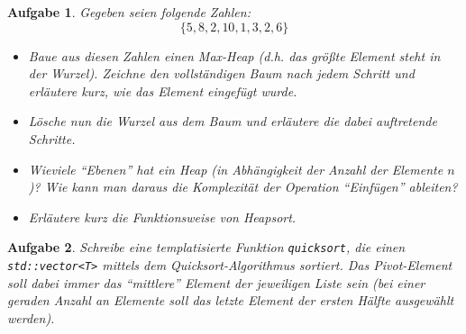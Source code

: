 \documentclass[a4paper,12pt,parskip=full]{scrartcl}
\theoremstyle{exercise}
\newtheorem{exercise}{Aufgabe}
\begin{document}
\begin{exercise}
Gegeben seien folgende Zahlen:
$$ \{ 5, 8, 2, 10, 1, 3, 2, 6 \} $$
\begin{itemize}
\item Baue aus diesen Zahlen einen Max-Heap (d.h. das größte Element
  steht in der Wurzel). Zeichne den vollständigen Baum nach jedem
  Schritt und erläutere kurz, wie das Element eingefügt wurde.
\item Lösche nun die Wurzel aus dem Baum und erläutere die dabei
  auftretende Schritte.
\item Wieviele ``Ebenen'' hat ein Heap (in Abhängigkeit der Anzahl der
  Elemente $n$)? Wie kann man daraus die Komplexität der Operation
  ``Einfügen'' ableiten?
\item Erläutere kurz die Funktionsweise von Heapsort.
\end{itemize}
\end{exercise}

\begin{exercise}
Schreibe eine templatisierte Funktion \texttt{quicksort},
die einen \lstinline{std::vector<T>} mittels dem Quicksort-Algorithmus
sortiert. Das Pivot-Element soll dabei immer das ``mittlere'' Element
der jeweiligen Liste sein (bei einer geraden Anzahl an Elemente soll
das letzte Element der ersten Hälfte ausgewählt werden).
\end{exercise}
\end{document}
